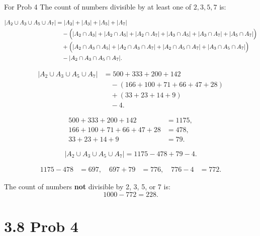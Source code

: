 \documentclass{report}
\begin{document}
\begin{RemarkWithLily}{For Prob 4}
  The count of numbers divisible by at least one of \(2,3,5,7\) is:
  
  \[
  \begin{aligned}
  |A_2 \cup A_3 \cup A_5 \cup A_7| &= |A_2|+|A_3|+|A_5|+|A_7| \\
  &\quad - \Bigl(|A_2 \cap A_3| + |A_2 \cap A_5| + |A_2 \cap A_7| + |A_3 \cap A_5| + |A_3 \cap A_7| + |A_5 \cap A_7|\Bigr)\\
  &\quad + \Bigl(|A_2 \cap A_3 \cap A_5| + |A_2 \cap A_3 \cap A_7| + |A_2 \cap A_5 \cap A_7| + |A_3 \cap A_5 \cap A_7|\Bigr)\\
  &\quad - |A_2 \cap A_3 \cap A_5 \cap A_7|.
  \end{aligned}
  \]
  
  \[
  \begin{aligned}
  |A_2 \cup A_3 \cup A_5 \cup A_7| &= 500 + 333 + 200 + 142 \\
  &\quad - (166 + 100 + 71 + 66 + 47 + 28) \\
  &\quad + (33 + 23 + 14 + 9) \\
  &\quad - 4.
  \end{aligned}
  \]
  
  \[
  \begin{aligned}
  500+333+200+142 &= 1175, \\
  166+100+71+66+47+28 &= 478, \\
  33+23+14+9 &= 79.
  \end{aligned}
  \]
  
  \[
  |A_2 \cup A_3 \cup A_5 \cup A_7| = 1175 - 478 + 79 - 4.
  \]
  
  \[
  \begin{aligned}
  1175 - 478 &= 697, \quad 
  697 + 79 &= 776, \quad
  776 - 4 &= 772.
  \end{aligned}
  \]
  
  The count of numbers \textbf{not} divisible by 2, 3, 5, or 7 is:
  \[
  1000 - 772 = 228.
  \]

\end{RemarkWithLily}

\section*{3.8 Prob 4}

\end{document}
